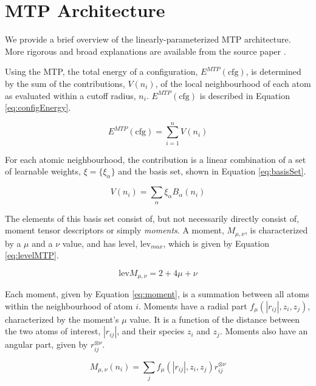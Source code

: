 \documentclass[9pt,twocolumn,twoside]{opticajnl}
\begin{document}
\section{MTP Architecture}
We provide a brief overview of the linearly-parameterized MTP architecture. More rigorous and broad explanations are available from the source paper \cite{mtp}.

Using the MTP, the total energy of a configuration, $E^{MTP} (\textrm{cfg}) $, is determined by the sum of the contributions, $V(n_i)$, of the local neighbourhood of each atom as evaluated within a cutoff radius, $n_i$. $E^{MTP} (\textrm{cfg}) $ is described in Equation \ref{eq:configEnergy}. 

\begin{equation} \label{eq:configEnergy}
  E^{MTP} (\textrm{cfg}) = \sum_{i=1}^{n} V(n_i)
\end{equation}

For each atomic neighbourhood, the contribution is a linear combination of a set of learnable weights, $\xi = \{\xi_\alpha\}$ and the basis set, shown in Equation \ref{eq:basisSet}.

\begin{equation} \label{eq:basisSet}
  V(n_i) = \sum_{\alpha} \xi_\alpha   B_\alpha (n_i)
\end{equation}

The elements of this basis set consist of, but not necessarily directly consist of, moment tensor descriptors or simply \textit{moments}. A moment, $M_{\mu,\nu}$,  is characterized by a $\mu$ and a $\nu$ value, and has level, $\textrm{lev}_{max}$, which is given by Equation \ref{eq:levelMTP}.

\begin{equation} \label{eq:levelMTP}
  \textrm{lev}M_{\mu,\nu} = 2 + 4\mu + \nu
\end{equation}

Each moment, given by Equation \ref{eq:moment}, is a summation between all atoms within the neighbourhood of atom $i$. Moments have a radial part $f_\mu (|r_{ij}|,z_i,z_j) $, characterized by the moment's $\mu$ value. It is a function of the distance between the two atoms of interest, $|r_{ij}|$, and their species $z_i$ and $z_j$. Moments also have an angular part, given by $r_{ij} ^{\otimes \nu}$.

\begin{equation} \label{eq:moment}
  M_{\mu,\nu} (n_i)= \sum_{j} f_\mu (|r_{ij}|,z_i,z_j) r_{ij} ^{\otimes \nu}
\end{equation}
\end{document}
